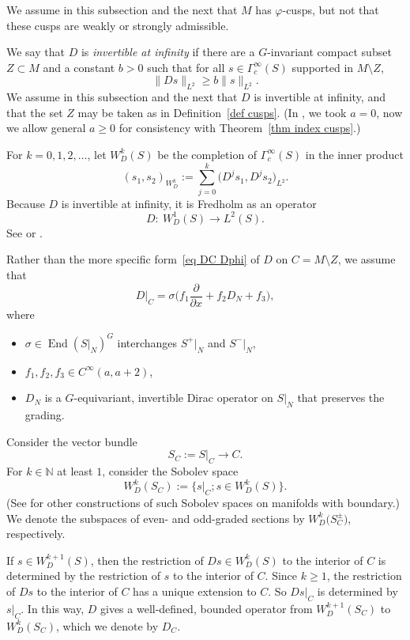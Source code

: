 \documentclass[pdftex]{sigma}%
\numberwithin{equation}{section}
\DeclareMathOperator{\End}{End}
\newcommand{\N}{\mathbb{N}}
\begin{document}
 We assume in this subsection and the next that $M$ has $\varphi$-cusps, but not that these cusps are weakly or strongly admissible.

We say that $D$ is \emph{invertible at infinity} if there are a $G$-invariant compact subset $Z\subset M$ and a constant $b>0$ such that for all $s \in \Gamma^{\infty}_c(S)$ supported in $M \setminus Z$,
\begin{equation} \label{eq D inv infty}
\|Ds\|_{L^2} \geq b \|s\|_{L^2}.
\end{equation}
We assume in this subsection and the next that $D$ is {invertible at infinity}, and that the set $Z$ may be taken as in Definition~\ref{def cusps}. (In \cite{HW21a}, we took $a=0$, now we allow general $a \geq 0$ for consistency with Theorem~\ref{thm index cusps}.)

For $k=0, 1, 2, \dots$, let $W^k_D(S)$ be the completion of $\Gamma^{\infty}_c(S)$ in the inner product
\begin{equation*}
(s_1, s_2)_{W^k_D} := \sum_{j=0}^k \big(D^js_1, D^js_2\big)_{L^2}.
\end{equation*}
Because $D$ is invertible at infinity, it is Fredholm as an operator
\[
D\colon\ W^1_D(S) \to L^2(S).
\]
See \cite[Theorem 2.1]{Anghel93b} or \cite[Theorem 3.2]{Gromov83}.


Rather than the more specific form~\eqref{eq DC Dphi} of $D$ on $C = M \setminus Z$, we assume that
\begin{equation} \label{eq D on U}
D|_C = \sigma \bigg(f_1 \frac{\partial}{\partial x} + f_2 D_N + f_3 \bigg),
\end{equation}
where
\begin{itemize}\itemsep=0pt
\item $\sigma \in \End(S|_N)^G$ interchanges $S^+|_N$ and $S^-|_N$,
\item $f_1, f_2, f_3 \in C^{\infty}(a,a+2)$,
\item $D_N$ is a $G$-equivariant, invertible Dirac operator on $S|_N$ that preserves the grading.
\end{itemize}

Consider the vector bundle
\[
S_C := S|_{C} \to C.
\]
For $k \in \N$ at least $1$, consider the Sobolev space
\[
W^k_D(S_C) := \big\{s|_C; s \in W^k_D(S)\big\}.
\]
(See \cite{BB12} for other constructions of such Sobolev spaces on manifolds with boundary.)
We denote the subspaces of even- and odd-graded sections by $W^k_D\big(S_C^{\pm}\big)$, respectively.

If $s \in W^{k+1}_D(S)$, then the restriction of $Ds \in W^k_D(S)$ to the interior of $C$ is determined by the restriction of $s$ to the interior of $C$. Since $k \geq 1$, the restriction of $Ds$ to the interior of $C$ has a unique extension to $C$. So $Ds|_C$ is determined by $s|_C$. In this way, $D$ gives a well-defined, bounded operator from $W^{k+1}_D(S_C)$ to $W^k_D(S_C)$, which we denote by
 $D_C$.
\end{document}
